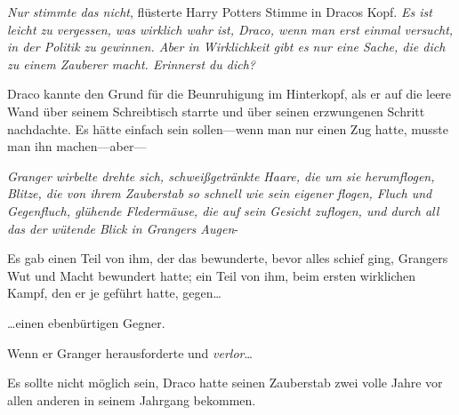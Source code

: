 \emph{Nur stimmte das nicht}, flüsterte Harry Potters Stimme in Dracos Kopf. \emph{Es ist leicht zu vergessen, was wirklich wahr ist, Draco, wenn man erst einmal versucht, in der Politik zu gewinnen. Aber in Wirklichkeit gibt es nur eine Sache, die dich zu einem Zauberer macht. Erinnerst du dich?}

Draco kannte den Grund für die Beunruhigung im Hinterkopf, als er auf die leere Wand über seinem Schreibtisch starrte und über seinen erzwungenen Schritt nachdachte. Es hätte einfach sein sollen—wenn man nur einen Zug hatte, musste man ihn machen—aber—

\emph{Granger wirbelte drehte sich, schweißgetränkte Haare, die um sie herumflogen, Blitze, die von ihrem Zauberstab so schnell wie sein eigener flogen, Fluch und Gegenfluch, glühende Fledermäuse, die auf sein Gesicht zuflogen, und durch all das der wütende Blick in Grangers Augen}-

Es gab einen Teil von ihm, der das bewunderte, bevor alles schief ging, Grangers Wut und Macht bewundert hatte; ein Teil von ihm, beim ersten wirklichen Kampf, den er je geführt hatte, gegen…

…einen ebenbürtigen Gegner.

Wenn er Granger herausforderte und \emph{verlor}…

Es sollte nicht möglich sein, Draco hatte seinen Zauberstab zwei volle Jahre vor allen anderen in seinem Jahrgang bekommen.

